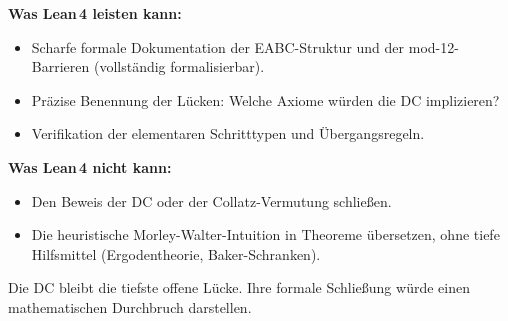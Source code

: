 \documentclass[12pt,a4paper]{article}
\begin{document}
\begin{tcolorbox}[kernidee]
\textbf{Was Lean\,4 leisten kann:}
\begin{itemize}
  \item Scharfe formale Dokumentation der EABC-Struktur
    und der mod-12-Barrieren (vollständig formalisierbar).
  \item Präzise Benennung der Lücken: Welche Axiome würden die DC implizieren?
  \item Verifikation der elementaren Schritttypen und Übergangsregeln.
\end{itemize}

\textbf{Was Lean\,4 nicht kann:}
\begin{itemize}
  \item Den Beweis der DC oder der Collatz-Vermutung schließen.
  \item Die heuristische Morley-Walter-Intuition in Theoreme übersetzen,
    ohne tiefe Hilfsmittel (Ergodentheorie, Baker-Schranken).
\end{itemize}

Die DC bleibt die tiefste offene Lücke. Ihre formale Schließung
würde einen mathematischen Durchbruch darstellen.
\end{tcolorbox}
\end{document}
